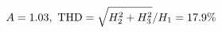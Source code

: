 \documentclass[preview]{standalone}
\begin{document}
\begin{align*}
\special{dvisvgm:raw <g id='unique000'>}A=1.03,\ \text{THD}=\sqrt{H_2^2+H_3^2}/H_1=17.9\%\special{dvisvgm:raw </g>}
\end{align*}
\end{document}
